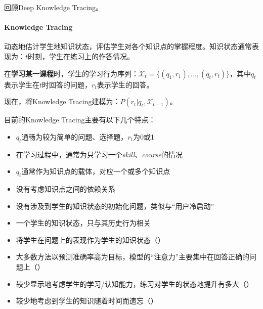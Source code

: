 回顾Deep Knowledge Tracing。

\paragraph{Knowledge Tracing}动态地估计学生地知识状态，评估学生对各个知识点的掌握程度。知识状态通常表现为：$t$时刻，学生在练习上的作答情况。

在\textbf{学习某一课程}时，学生的学习行为序列：$\mathcal{X}_t = \{(q_1, r_1), ..., (q_t, r_t)\}$，其中$q_t$表示学生在$t$时回答的问题，$r_t$表示学生的回答。

现在，将Knowledge Tracing建模为：$P(r_t | q_t,\mathcal{X}_{t-1})$。

目前的Knowledge Tracing主要有以下几个特点：
\begin{itemize}
	\item $q_t$通畅为较为简单的问题、选择题，$r_t$为0或1
	\item 在学习过程中，通常为只学习一个\textit{skill}、\textit{course}的情况
	\item $q_i$通常作为知识点的载体，对应一个或多个知识点
	\item 没有考虑知识点之间的依赖关系
	\item 没有涉及到学生的知识状态的初始化问题，类似与“用户冷启动”
	\item 一个学生的知识状态，只与其历史行为相关
	\item 将学生在问题上的表现作为学生的知识状态（）
	\item 大多数方法以预测准确率高为目标，模型的“注意力”主要集中在回答正确的问题上（\cite{shen2021learning}）
	\item 较少显示地考虑学生的学习/认知能力，练习对学生的状态地提升有多大（\cite{long2021tracing, shen2021learning}）
	\item 较少地考虑到学生的知识随着时间而遗忘（\cite{shen2021learning}）
\end{itemize}
